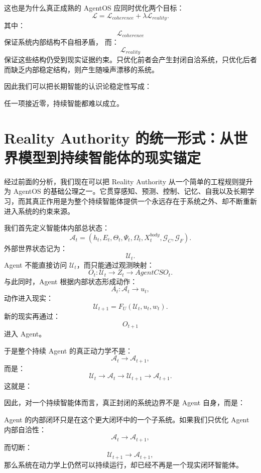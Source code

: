 这也是为什么真正成熟的 AgentOS 应同时优化两个目标：
\[
\mathcal L
=
\mathcal L_{coherence}
+
\lambda
\mathcal L_{reality}.
\]
其中：
\[
\mathcal L_{coherence}
\]
保证系统内部结构不自相矛盾，
而：
\[
\mathcal L_{reality}
\]
保证这些结构仍受到现实证据约束。只优化前者会产生封闭自洽系统，只优化后者而缺乏内部稳定结构，则产生随噪声漂移的系统。

因此我们可以把长期智能的认识论稳定性写成：
\begin{statementbox}
\centering
{}
\end{statementbox}
任一项接近零，持续智能都难以成立。

\section{Reality Authority 的统一形式：从世界模型到持续智能体的现实锚定}

经过前面的分析，我们现在可以把 Reality Authority 从一个简单的工程规则提升为 AgentOS 的基础公理之一。它贯穿感知、预测、控制、记忆、自我以及长期学习，而其真正作用是为整个持续智能体提供一个永远存在于系统之外、却不断重新进入系统的约束来源。

我们首先定义智能体内部总状态：
\[
\mathcal A_t
=
(
h_t,
E_t,
\Theta_t,
\Psi_t,
\Omega_t,
X_t^{body},
\mathcal G_C,
\mathcal G_F
).
\]
外部世界状态记为：
\[
\mathcal U_t.
\]
Agent 不能直接访问 $\mathcal U_t$，而只能通过观测映射：
\[
O_t:
\mathcal U_t
\rightarrow
Z_t
\rightarrow
AgentCSO_t.
\]
与此同时，Agent 根据内部状态形成动作：
\[
A_t:
\mathcal A_t
\rightarrow
u_t,
\]
动作进入现实：
\[
\mathcal U_{t+1}
=
F_U
(
\mathcal U_t,
u_t,
w_t
).
\]
新的现实再通过：
\[
O_{t+1}
\]
进入 Agent。

于是整个持续 Agent 的真正动力学不是：
\[
\mathcal A_t
\rightarrow
\mathcal A_{t+1},
\]
而是：
\[
\boxed{
\mathcal U_t
\rightarrow
\mathcal A_t
\rightarrow
\mathcal U_{t+1}
\rightarrow
\mathcal A_{t+1}.
}
\]
这就是：
\begin{statementbox}
\centering
{}
\end{statementbox}

因此，对一个持续智能体而言，真正封闭的系统边界不是 Agent 自身，而是：
\begin{statementbox}
\centering
{}
\end{statementbox}
Agent 的内部闭环只是在这个更大闭环中的一个子系统。如果我们只优化 Agent 内部自洽性：
\[
\mathcal A_t\rightarrow\mathcal A_{t+1},
\]
而切断：
\[
\mathcal U_{t+1}\rightarrow\mathcal A_{t+1},
\]
那么系统在动力学上仍然可以持续运行，却已经不再是一个现实闭环智能体。

